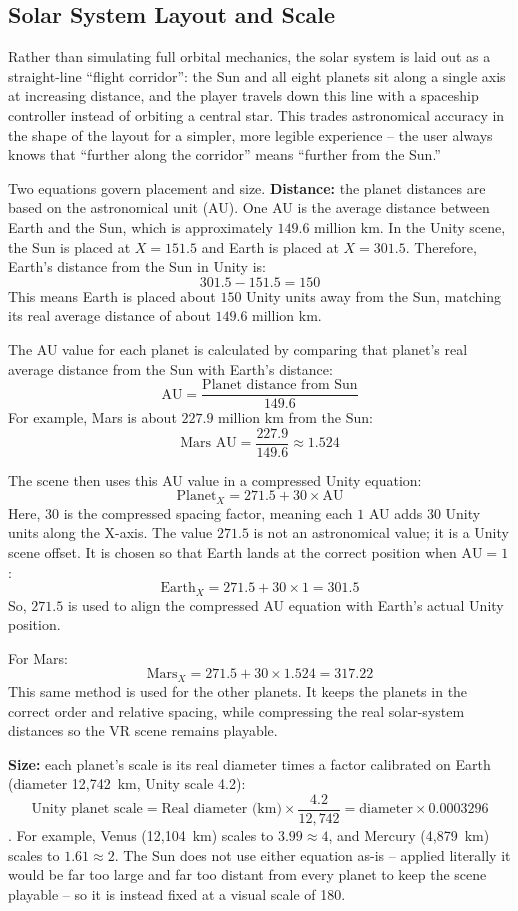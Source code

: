 \documentclass[journal]{vgtc}
\begin{document}
\subsection{Solar System Layout and Scale}
\label{sec:layout-scale}
Rather than simulating full orbital mechanics, the solar system is laid out as a straight-line ``flight corridor'': the Sun and all eight planets sit along a single axis at increasing distance, and the player travels down this line with a spaceship controller instead of orbiting a central star. This trades astronomical accuracy in the shape of the layout for a simpler, more legible experience -- the user always knows that ``further along the corridor'' means ``further from the Sun.''

Two equations govern placement and size. 
\textbf{Distance:} the planet distances are based on the astronomical unit (AU). One AU is the average distance between Earth and the Sun, which is approximately $149.6$ million km. In the Unity scene, the Sun is placed at $X = 151.5$ and Earth is placed at $X = 301.5$. Therefore, Earth's distance from the Sun in Unity is:
\[
301.5 - 151.5 = 150
\]
This means Earth is placed about $150$ Unity units away from the Sun, matching its real average distance of about $149.6$ million km.

The AU value for each planet is calculated by comparing that planet's real average distance from the Sun with Earth's distance:
\[
\text{AU} = \frac{\text{Planet distance from Sun}}{149.6}
\]
For example, Mars is about $227.9$ million km from the Sun:
\[
\text{Mars AU} = \frac{227.9}{149.6} \approx 1.524
\]

The scene then uses this AU value in a compressed Unity equation:
\[
\text{Planet}_X = 271.5 + 30 \times \text{AU}
\]
Here, $30$ is the compressed spacing factor, meaning each $1$ AU adds $30$ Unity units along the X-axis. The value $271.5$ is not an astronomical value; it is a Unity scene offset. It is chosen so that Earth lands at the correct position when $\text{AU} = 1$:
\[
\text{Earth}_X = 271.5 + 30 \times 1 = 301.5
\]
So, $271.5$ is used to align the compressed AU equation with Earth's actual Unity position.

For Mars:
\[
\text{Mars}_X = 271.5 + 30 \times 1.524 = 317.22
\]
This same method is used for the other planets. It keeps the planets in the correct order and relative spacing, while compressing the real solar-system distances so the VR scene remains playable.

\textbf{Size:} each planet's scale is its real diameter times a factor calibrated on Earth (diameter 12,742~km, Unity scale 4.2):
\begin{equation*}
\text{Unity planet scale} = \text{Real diameter (km)} \times \frac{4.2}{12{,}742} = \text{diameter} \times 0.0003296
\end{equation*}.
For example, Venus (12,104~km) scales to $3.99 \approx 4$, and Mercury (4,879~km) scales to $1.61 \approx 2$. The Sun does not use either equation as-is -- applied literally it would be far too large and far too distant from every planet to keep the scene playable -- so it is instead fixed at a visual scale of 180.
\end{document}
